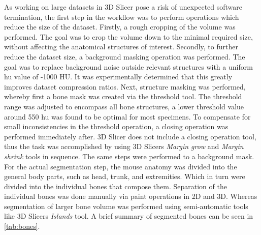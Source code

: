 \noindent
As working on large datasets in 3D Slicer pose a risk of unexpected software termination, the first step in the workflow was to perform operations which reduce the size of the dataset.
Firstly, a rough cropping of the volume was performed.
The goal was to crop the volume down to the minimal required size, without affecting the anatomical structures of interest.
Secondly, to further reduce the dataset size, a background masking operation was performed.
The goal was to replace background noise outside relevant structures with a uniform \acrshort{hu} value of -1000 HU.
It was experimentally determined that this greatly improves dataset compression ratios.
Next, structure masking was performed, whereby first a bone mask was created via the threshold tool.
The threshold range was adjusted to encompass all bone structures, a lower threshold value around 550 \acrshort{hu} was found to be optimal for most specimens.
To compensate for small inconsistencies in the threshold operation, a closing operation was performed immediately after.
3D Slicer does not include a closing operation tool, thus the task was
accomplished by using 3D Slicers \textit{Margin grow} and \textit{Margin shrink} tools in sequence.
The same steps were performed to a background mask.
For the actual segmentation step, the mouse anatomy was divided into the general body parts, such as head, trunk, and extremities.
Which in turn were divided into the individual bones that compose them.
Separation of the individual bones was done manually via paint operations in 2D and 3D.
Whereas segmentation of larger bone volume was performed using semi-automatic tools like 3D Slicers \textit{Islands} tool.
A brief summary of segmented bones can be seen in \cref{tab:bones}.

